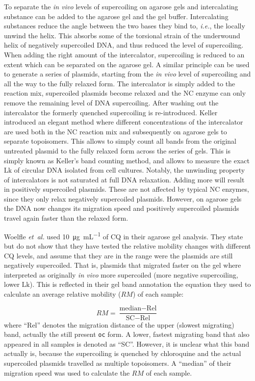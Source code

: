 \documentclass[10pt,a4]{article}
\newcommand{\ugml}{\micro\gram\per\milli\liter}
\newcommand{\lk}{\ensuremath{\text{Lk}}}
\newcommand{\etal}{\textit{et~al.}}
\newcommand{\ie}{\textit{i.e.}}
\begin{document}
To separate the \textit{in vivo} levels of supercoiling on agarose
gels and intercalating substance can be added to the agarose gel and
the gel buffer.  Intercalating substances reduce the angle between the
two bases they bind to, \ie{}, the locally unwind the helix. This
absorbs some of the torsional strain of the underwound helix of
negatively supercoiled DNA, and thus reduced the level of
supercoiling.  When adding the right amount of the intercalator,
supercoiling is reduced to an extent which can be separated on the
agarose gel.  A similar principle can be used to generate a series of
plasmids, starting from the \textit{in vivo} level of supercoiling and
all the way to the fully relaxed form. The intercalator is simply
added to the reaction mix, supercoiled plasmids become relaxed and the
NC enzyme can only remove the remaining level of DNA supercoiling.
After washing out the intercalator the formerly quenched supercoiling
is re-introduced. Keller \cite{Keller1975b} introduced an elegant
method where different concentrations of the intercalator are used
both in the NC reaction mix and subsequently on agarose gels to
separate topoisomers. This allows to simply count all bands from the
original untreated plasmid to the fully relaxed form across the series
of gels. This is simply known as Keller's band counting method, and
allows to measure the exact \lk{} of circular DNA isolated from cell
cultures.
%
Notably, the unwinding property of intercalators is not saturated at
full DNA relaxation. Adding more will result in positively supercoiled
plasmids. These are not affected by typical NC enzymes, since they
only relax negatively supercoiled plasmids. However, on agarose gels
the DNA now changes its migration speed and positively supercoiled
plasmids travel again faster than the relaxed form.

Woelfle \etal{} \cite{Woelfle2007} used \SI{10}{\ugml} of CQ in their
agarose gel analysis. They state but do not show that they have tested
the relative mobility changes with different CQ levels, and assume
that they are in the range were the plasmids are still negatively
supercoiled.  That is, plasmids that migrated faster on the gel where
interpreted as originally \textit{in vivo} more supercoiled (more
negative supercoiling, lower $\lk$). This is reflected in their
gel band annotation the equation they used to calculate an average
relative mobility ($RM$) of each sample:

\begin{equation}
  RM = \frac{\text{median} - \text{Rel}}{\text{SC} - \text{Rel}}
\end{equation}
where ``Rel'' denotes the migration distance of the upper (slowest
migrating) band, actually the still present \texttt{oc} form.
A lower, fastest migrating band that also appeared in all samples
is denoted as ``SC''. However, it is unclear what this band actually
is, because the supercoiling is quenched by chloroquine and the actual
supercoiled plasmids travelled as multiple topoisomers. A ``median'' of
their migration speed was used to calculate the $RM$ of each sample.
\end{document}
